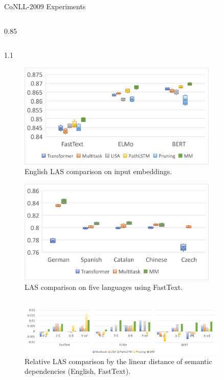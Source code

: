 \begin{exampleblock}{CoNLL-2009 Experiments}
\begin{column}{0.85\colwidth}
\end{column}
\begin{column}{1.1\colwidth}
\begin{figure}
\vspace{-1cm}
\captionsetup{justification=centering}
    \centering
    \includegraphics[width=0.85\textwidth]{images/poster-perf-english-by-embeddings.png}
    \caption{English LAS comparison on input embeddings.}
    \label{fig:perf-emb}
\end{figure}
\begin{figure}
\captionsetup{justification=centering}
    \centering
    \includegraphics[width=0.85\textwidth]{images/poster-perf-multilingual.png}
    \caption{LAS comparison on five languages using FastText.}
    \label{fig:perf-multilingual}
\end{figure}

\end{column}

\begin{figure}
    \centering
    \captionsetup{justification=centering}
    \includegraphics[width=0.9\textwidth]{images/perf-by-ll.drawio.png}
    \caption{Relative LAS comparison by the linear distance of semantic dependencies (English, FastText). }
    \label{fig:perf-by-ll}
\end{figure}


\end{exampleblock}